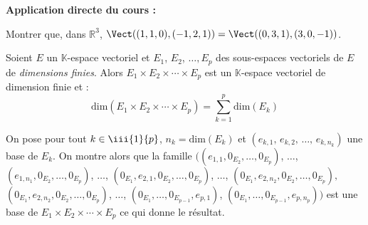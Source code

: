 \documentclass[french,11pt,twoside]{VcCours}
\newenvironment{ApplicationDirecte}{\textbf{Application directe du cours :}

}{}
\begin{document}
\begin{ApplicationDirecte} Montrer que, dans $\mathbb{R}^3$, $\Vect((1,1,0), (-1,2,1))= \Vect((0,3,1), (3,0,-1))$.
\end{ApplicationDirecte}

\begin{Proposition}{}
Soient $E$ un $\mathbb{K}$-espace vectoriel et $E_1$, $E_2$, $\ldots, E_p$ des sous-espaces vectoriels de $E$ de \emph{dimensions finies}. Alors $E_1 \times E_2 \times \cdots \times E_p$ est un $\mathbb{K}$-espace vectoriel de dimension finie et :
$$ \textrm{dim}(E_1 \times E_2 \times \cdots \times E_p) = \sum_{k=1}^p \textrm{dim} (E_k)$$
\end{Proposition}

\begin{Demonstration}{} On pose pour tout $k \in \iii{1}{p}$, 
	$n_k = \textrm{dim} (E_k)$ et $(e_{k,1}, \, e_{k,2}, \, \ldots, \, e_{k,n_k})$ 
	une base de $E_k$. On montre alors que la famille 
	$((e_{1,1}, 0_{E_2}, \ldots, 0_{E_p})$, $\ldots$, 
	$(e_{1,n_1}, 0_{E_2}, \ldots, 0_{E_p})$, $\ldots$, 
	$(0_{E_1},e_{2,1}, 0_{E_2}, \ldots, 0_{E_p})$, $\ldots$,
	$(0_{E_1},e_{2,n_2}, 0_{E_2}, \ldots,0_{E_p}),$
	$(0_{E_1},e_{2,n_2}, 0_{E_2}, \ldots,0_{E_p})$, $\ldots$, 
	$(0_{E_1},\ldots, 0_{E_{p-1}}, e_{p,1})$, $(0_{E_1},\ldots, 
	0_{E_{p-1}}, e_{p,n_p}))$ est une base de $E_1 \times E_2 \times \cdots \times E_p$
	ce qui donne le résultat.
\end{Demonstration}


\end{document}
